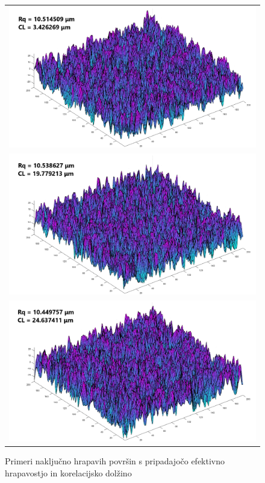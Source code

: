 \documentclass[a4paper,twoside,openright,12pt,slovene]{book}
\begin{document}
\begin{figure}[htp!]
\centering

\begin{tabular}{c}
  \includegraphics[width=114mm]{Slike/CL3.png} \\
  \includegraphics[width=114mm]{Slike/CL19.png} \\
  \includegraphics[width=114mm]{Slike/CL24.png} \\
\end{tabular}

\caption{Primeri naključno hrapavih površin s pripadajočo efektivno hrapavostjo in korelacijsko dolžino}
\end{figure}
\end{document}
